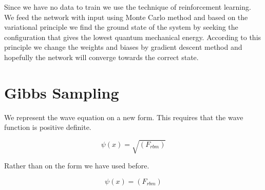 Since we have no data to train we use the technique of reinforcement learning. We feed the network with input using Monte Carlo method and based on the variational principle we find the ground state of the system by seeking the configuration that gives the lowest quantum mechanical energy. According to this principle we change the weights and biases by gradient descent method and hopefully the network will converge towards the correct state.  

\section{Gibbs Sampling}

We represent the wave equation on a new form. This requires that the wave function is positive definite. 

\begin{equation}\label{eq:Gibbs}
\psi(x) = \sqrt{(F_{rbm})}
\end{equation}

Rather than on the form we have used before.

\begin{equation}\label{eq:Gibbs_new}
\psi(x) = (F_{rbm})
\end{equation}